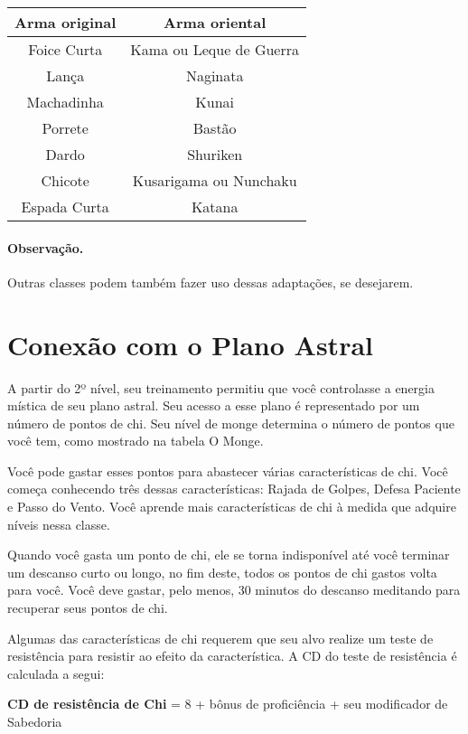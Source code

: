 \begin{multicols}{2}
\begin{center}
\begin{tabular}{c | c}
\textbf{Arma original} & \textbf{Arma oriental} \\ \hline
Foice Curta & Kama ou Leque de Guerra \\
Lança & Naginata \\
Machadinha & Kunai \\
Porrete & Bastão \\
Dardo & Shuriken \\
Chicote & Kusarigama ou Nunchaku \\
Espada Curta & Katana \\
\end{tabular}
\end{center}

\paragraph{Observação.}%

Outras classes podem também fazer uso dessas adaptações, se desejarem.

\section*{Conexão com o Plano Astral}%
\label{sec:conexao_com_o_plano_astral}

A partir do 2º nível, seu treinamento permitiu que você controlasse a energia
mística de seu plano astral. Seu acesso a esse plano é representado por um
número de pontos de chi. Seu nível de monge determina o número de pontos que
você tem, como mostrado na tabela O Monge.

Você pode gastar esses pontos para abastecer várias características de chi. Você
começa conhecendo três dessas características: Rajada de Golpes, Defesa Paciente
e Passo do Vento. Você aprende mais características de chi à medida que adquire
níveis nessa classe.

Quando você gasta um ponto de chi, ele se torna indisponível até você terminar
um descanso curto ou longo, no fim deste, todos os pontos de chi gastos volta
para você. Você deve gastar, pelo menos, 30 minutos do descanso meditando para
recuperar seus pontos de chi.

Algumas das características de chi requerem que seu alvo realize um teste de
resistência para resistir ao efeito da característica. A CD do teste de
resistência é calculada a segui:

\begin{center}
\textbf{CD de resistência de Chi} = 8 + bônus de proficiência +
seu modificador de Sabedoria
\end{center}


\end{multicols}
